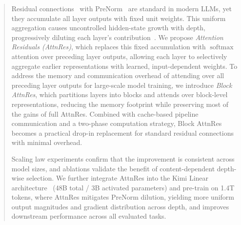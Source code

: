 \vspace{-15pt}
\begin{abstract}
    Residual connections~\citep{he2015resnet} with PreNorm~\citep{xiong2020layer} are standard in modern LLMs, yet they accumulate all layer outputs with fixed unit weights. This uniform aggregation causes uncontrolled hidden-state growth with depth, progressively diluting each layer's contribution~\citep{li2026siamesenorm}.
    We propose \emph{Attention Residuals (AttnRes)}, which replaces this fixed accumulation with $\operatorname{softmax}$ attention over preceding layer outputs, allowing each layer to selectively aggregate earlier representations with learned, input-dependent weights.
    To address the memory and communication overhead of attending over all preceding layer outputs for large-scale model training, we introduce \emph{Block AttnRes}, which partitions layers into blocks and attends over block-level representations, reducing the memory footprint while preserving most of the gains of full AttnRes. Combined with cache-based pipeline communication and a two-phase computation strategy, Block AttnRes becomes a practical drop-in replacement for standard residual connections with minimal overhead.

    Scaling law experiments confirm that the improvement is consistent across model sizes, and ablations validate the benefit of content-dependent depth-wise selection.
    We further integrate AttnRes into the Kimi Linear architecture~\citep{zhang2025kimi} (48B total / 3B activated parameters) and pre-train on 1.4T tokens, where AttnRes mitigates PreNorm dilution, yielding more uniform output magnitudes and gradient distribution across depth, and improves downstream performance across all evaluated tasks.
\end{abstract}
\vspace{-20pt}
